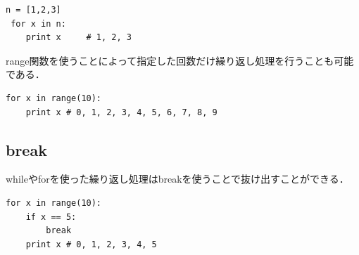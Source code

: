 \documentclass[11pt]{jarticle}
\begin{document}
\begin{lstlisting}[basicstyle=\ttfamily\footnotesize, frame=single]
 n = [1,2,3]
 for x in n:
 	print x 	# 1, 2, 3
\end{lstlisting}
range関数を使うことによって指定した回数だけ繰り返し処理を行うことも可能である．
\begin{lstlisting}[basicstyle=\ttfamily\footnotesize, frame=single]
 for x in range(10):
 	print x	# 0, 1, 2, 3, 4, 5, 6, 7, 8, 9
\end{lstlisting}

\subsection{break}
whileやforを使った繰り返し処理はbreakを使うことで抜け出すことができる．
\begin{lstlisting}[basicstyle=\ttfamily\footnotesize, frame=single]
 for x in range(10):
 	if x == 5:
		break
	print x	# 0, 1, 2, 3, 4, 5
\end{lstlisting}
\end{document}
